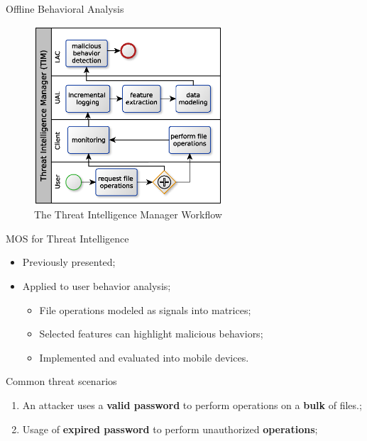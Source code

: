 \documentclass[newPxFont, numfooter, sectionpages]{beamer}
\begin{document}
\begin{frame}[c]{Offline Behavioral Analysis}
	
	\begin{figure}[h!]
		\centering
		\includegraphics[width=7cm]{../figures/fig06.eps}
		\caption{The Threat Intelligence Manager Workflow}
		\label{fig:3_06}
	\end{figure}
	
\end{frame}
\begin{frame}[c]{MOS for Threat Intelligence}
	
	\begin{itemize}
		\item Previously presented;
		\item Applied to user behavior analysis;
		\begin{itemize}
			\item File operations modeled as signals into matrices;
			\item Selected features can highlight malicious behaviors;
			\item Implemented and evaluated into mobile devices.
		\end{itemize}
	\end{itemize}
	
\end{frame}
\begin{frame}[c]{Common threat scenarios}
	
	\begin{enumerate}
		\item An attacker uses a \textbf{valid password} to perform operations on a \textbf{bulk} of files.;
		\item Usage of \textbf{expired password} to perform unauthorized \textbf{operations};
	\end{enumerate}
	
\end{frame}
\end{document}
